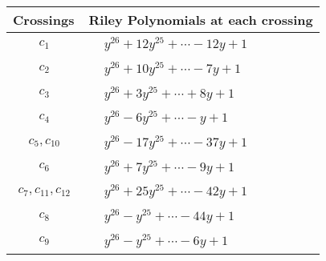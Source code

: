 \documentclass[1p]{elsarticle_modified}
\theoremstyle{definition}
\begin{document}
\begin{tabular}{m{50pt}|m{274pt}}
Crossings & \hspace{64pt}Riley Polynomials at each crossing \\
\hline $$\begin{aligned}c_{1}\end{aligned}$$&$\begin{aligned}
&y^{26}+12 y^{25}+\cdots-12 y+1
\end{aligned}$\\
\hline $$\begin{aligned}c_{2}\end{aligned}$$&$\begin{aligned}
&y^{26}+10 y^{25}+\cdots-7 y+1
\end{aligned}$\\
\hline $$\begin{aligned}c_{3}\end{aligned}$$&$\begin{aligned}
&y^{26}+3 y^{25}+\cdots+8 y+1
\end{aligned}$\\
\hline $$\begin{aligned}c_{4}\end{aligned}$$&$\begin{aligned}
&y^{26}-6 y^{25}+\cdots- y+1
\end{aligned}$\\
\hline $$\begin{aligned}c_{5},c_{10}\end{aligned}$$&$\begin{aligned}
&y^{26}-17 y^{25}+\cdots-37 y+1
\end{aligned}$\\
\hline $$\begin{aligned}c_{6}\end{aligned}$$&$\begin{aligned}
&y^{26}+7 y^{25}+\cdots-9 y+1
\end{aligned}$\\
\hline $$\begin{aligned}c_{7},c_{11},c_{12}\end{aligned}$$&$\begin{aligned}
&y^{26}+25 y^{25}+\cdots-42 y+1
\end{aligned}$\\
\hline $$\begin{aligned}c_{8}\end{aligned}$$&$\begin{aligned}
&y^{26}- y^{25}+\cdots-44 y+1
\end{aligned}$\\
\hline $$\begin{aligned}c_{9}\end{aligned}$$&$\begin{aligned}
&y^{26}- y^{25}+\cdots-6 y+1
\end{aligned}$\\
\hline
\end{tabular}\\~\\
\end{document}
